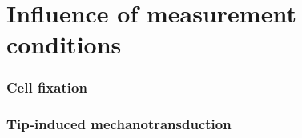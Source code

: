 \part{Influence of measurement conditions}

\section{Cell fixation}

\section{Tip-induced mechanotransduction}
